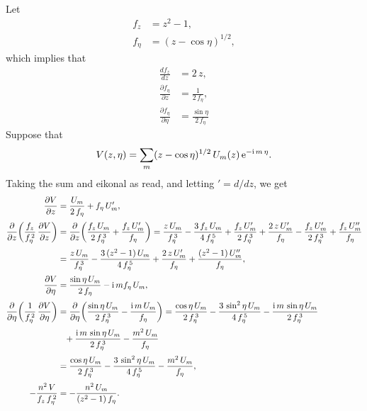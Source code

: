 \documentclass[12pt,prb,aps,notitlepage]{revtex4-1}
\begin{document}
Let
\begin{align}
f_z &= z^2-1,\\[0.5ex]
f_\eta &= (z-\cos\eta)^{1/2},
\end{align}
which implies that
\begin{align}
\frac{df_z}{dz} &= 2\,z,\\[0.5ex]
\frac{\partial f_\eta}{\partial z}&= \frac{1}{2\,f_\eta},\\[0.5ex]
\frac{\partial f_\eta}{\partial\eta} &= \frac{\sin\eta}{2\,f_\eta}
\end{align}
Suppose that
\begin{equation}
V(z,\eta)= \sum_m (z-\cos\eta)^{1/2}\,U_m(z)\,{\rm e}^{-{\rm i}\,m\,\eta}.
\end{equation}
Taking the sum and eikonal as read, and letting $'=d/dz$, we get 
\begin{align}
\frac{\partial V}{\partial z} &=\frac{U_m}{2\,f_\eta} + f_\eta\,U_m',\\[0.5ex]
\frac{\partial}{\partial z}\!\left(\frac{f_z}{f_\eta^{\,2}}\,\frac{\partial V}{\partial z}\right)&=
\frac{\partial}{\partial z}\!\left(\frac{f_z\,U_m}{2\,f_\eta^{\,3}}+ \frac{f_z\,U_m'}{f_\eta}\right)
= \frac{z\,U_m}{f_\eta^{\,3}} -\frac{3\,f_z\,U_m}{4\,f_\eta^{\,5}}+\frac{f_z\,U_m'}{2\,f_\eta^{\,3}}
+\frac{2\,z\,U_m'}{f_\eta}- \frac{f_z\,U_m'}{2\,f_\eta^{\,3}}
+\frac{f_z\,U_m''}{f_\eta}\nonumber\\[0.5ex]
&=\frac{z\,U_m}{f_\eta^{\,3}} -\frac{3\,(z^2-1)\,U_m}{4\,f_\eta^{\,5}}
+\frac{2\,z\,U_m'}{f_\eta}
+\frac{(z^2-1)\,U_m''}{f_\eta},\\[0.5ex]
\frac{\partial V}{\partial \eta} &=\frac{\sin\eta\,U_m}{2\,f_\eta} -{\rm i}\,m f_\eta\,U_m,\\[0.5ex]
\frac{\partial}{\partial \eta}\!\left(\frac{1}{f_\eta^{\,2}}\,\frac{\partial V}{\partial \eta}\right)&=
\frac{\partial}{\partial \eta}\!\left(\frac{\sin\eta\,U_m}{2\,f_\eta^{\,3}}-\frac{{\rm i}\,m\,U_m}{f_\eta}\right)=
\frac{\cos\eta\,U_m}{2\,f_\eta^{\,3}}- \frac{3\,\sin^2\eta\,U_m}{4\,f_\eta^{\,5}}-\frac{{\rm i}\,m\,\sin\eta\,U_m}{2\,f_\eta^{\,3}}\nonumber\\[0.5ex]
&\phantom{=} + \frac{{\rm i}\,m\,\sin\eta\,U_m}{2\,f_\eta^{\,3}} - \frac{m^2\,U_m}{f_\eta}\nonumber\\[0.5ex]
&=\frac{\cos\eta\,U_m}{2\,f_\eta^{\,3}}- \frac{3\,\sin^2\eta\,U_m}{4\,f_\eta^{\,5}} - \frac{m^2\,U_m}{f_\eta},\\[0.5ex]
-\frac{n^2\,V}{f_z\,f_\eta^{\,2}}&= -\frac{n^2\,U_m}{(z^2-1)\,f_\eta}.
\end{align}
\end{document}
